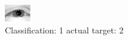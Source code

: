 \begin{figure}[h!]
\begin{center}
\includegraphics[width=0.60\columnwidth]{figures/ID2337_class_1_target_2.png}
\end{center}
\caption{ Classification: 1 actual target: 2}
\label{fig:ID2337_class_1_target_2}
\end{figure}
